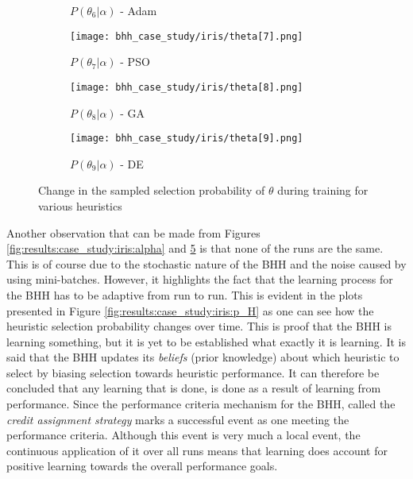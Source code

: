\begin{figure}[htbp]
\begin{subfigure}{0.5\textwidth}
            \caption{$P(\theta_{6} | \alpha)$ - \Acs{Adam}}
            \label{fig:results:case_study:iris:p_theta:6}
      \end{subfigure}
      \begin{subfigure}{0.5\textwidth}
            \centering
            \texttt{[image: bhh\_case\_study/iris/theta[7].png]}
            \caption{$P(\theta_{7} | \alpha)$ - \Acs{PSO}}
            \label{fig:results:case_study:iris:p_theta:7}
      \end{subfigure}
      \par\medskip
      \begin{subfigure}{0.5\textwidth}
            \centering
            \texttt{[image: bhh\_case\_study/iris/theta[8].png]}
            \caption{$P(\theta_{8} | \alpha)$ - \Acs{GA}}
            \label{fig:results:case_study:iris:p_theta:8}
      \end{subfigure}
      \begin{subfigure}{0.5\textwidth}
            \centering
            \texttt{[image: bhh\_case\_study/iris/theta[9].png]}
            \caption{$P(\theta_{9} | \alpha)$ - \Acs{DE}}
            \label{fig:results:case_study:iris:p_theta:9}
      \end{subfigure}
      \par\medskip
      \caption{Change in the sampled selection probability of $\theta$ during training for various heuristics}
      \label{fig:results:case_study:iris:p_theta}
\end{figure}








Another observation that can be made from Figures \ref{fig:results:case_study:iris:alpha} and \ref{fig:results:case_study:iris:p_theta} is that none of the runs are the same. This is of course due to the stochastic nature of the \Acs{BHH} and the noise caused by using mini-batches. However, it highlights the fact that the learning process for the \Acs{BHH} has to be adaptive from run to run. This is evident in the plots presented in Figure \ref{fig:results:case_study:iris:p_H} as one can see how the heuristic selection probability changes over time. This is proof that the \Ac{BHH} is learning something, but it is yet to be established what exactly it is learning. It is said that the \Acs{BHH} updates its \textit{beliefs} (prior knowledge) about which heuristic to select by biasing selection towards heuristic performance. It can therefore be concluded that any learning that is done, is done as a result of learning from performance. Since the performance criteria mechanism for the \Ac{BHH}, called the \textit{credit assignment strategy} marks a successful event as one meeting the performance criteria. Although this event is very much a local event, the continuous application of it over all runs means that learning does account for positive learning towards the overall performance goals.




